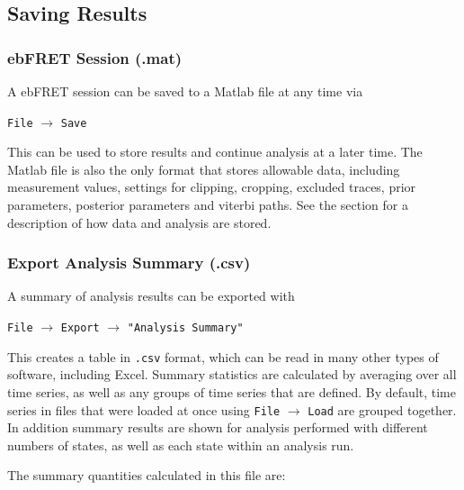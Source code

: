 \documentclass[12pt,article,oldfontcommands]{memoir}
\newcommand{\indt}{\qquad}
\begin{document}
\subsection{Saving Results}
\label{sec:save-export}

\subsubsection{ebFRET Session (.mat)}

A ebFRET session can be saved to a Matlab file at any time via 

\indt\texttt{File} $\to$ \texttt{Save}

This can be used to store results and continue analysis at a later time. The Matlab file is also the only format that stores allowable data, including measurement values, settings for clipping, cropping, excluded traces, prior parameters, posterior parameters and viterbi paths. See the \emph{} section for a description of how data and analysis are stored.

\subsubsection{Export Analysis Summary (.csv)}

A summary of analysis results can be exported with 

\indt\texttt{File} $\to$ \texttt{Export} $\to$ \texttt{"Analysis Summary"}
\label{sec:summary}

This creates a table in \texttt{.csv} format, which can be read in many other types of software, including Excel. Summary statistics are calculated by averaging over all time series, as well as any groups of time series that are defined. By default, time series in files that were loaded at once using \texttt{File} $\to$ \texttt{Load} are grouped together. In addition summary results are shown for analysis performed with different numbers of states, as well as each state within an analysis run. 

The summary quantities calculated in this file are:
\end{document}
